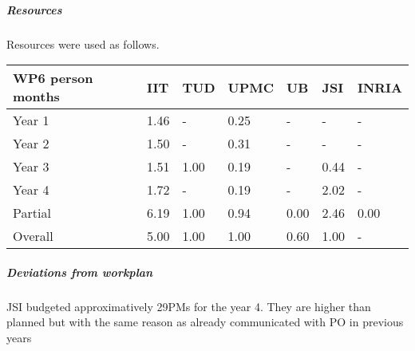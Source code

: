 

\subparagraph*{Resources}

Resources were used as follows.

\begin{center}
\begin{tabular}{|C{1.5cm}|C{1.5cm}|C{1.5cm}|C{2cm}|C{2cm}|C{2cm}|C{2cm}|}
\hline
\footnotesize \textbf{WP6 person months}& \footnotesize \textbf{IIT}&\footnotesize \textbf{TUD}&\footnotesize \textbf{UPMC}& \footnotesize \textbf{UB} &\footnotesize \textbf{JSI} & \footnotesize \textbf{INRIA} \\ \hline
\footnotesize Year 1 &  1.46 & - & 0.25 & - & - & -    \\  \hline
\footnotesize Year 2 &  1.50 & - & 0.31 & - & - & -     \\  \hline
\footnotesize Year 3 &  1.51 & 1.00 & 0.19 & - & 0.44 & - \\ \hline
\footnotesize Year 4  & 1.72  &  -    &  0.19 &  -     &  2.02  &  -  \\   \hline
\footnotesize Partial & 6.19  &  1.00 &  0.94 &  0.00  &  2.46 &  0.00    \\
\hline \hline
\footnotesize Overall &  5.00 & 1.00 & 1.00 & 0.60 & 1.00 & - \\ \hline
\end{tabular}
\end{center}

\subparagraph*{Deviations from workplan} 
JSI budgeted approximatively 29PMs for the year 4. They are higher than planned but with the same reason as already communicated with PO in previous years 
